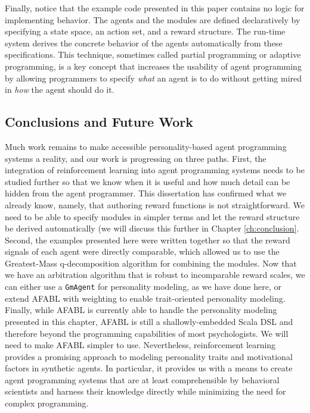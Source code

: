 
Finally, notice that the example code presented in this paper contains no logic for implementing behavior.  The agents and the modules are defined declaratively by specifying a state space, an action set, and a reward structure.  The run-time system derives the concrete behavior of the agents automatically from these specifications.  This technique, sometimes called partial programming or adaptive programming\cite{simpkins2008towards}, is a key concept that increases the usability of agent programming by allowing programmers to specify {\em what} an agent is to do without getting mired in {\em how} the agent should do it.

\subsection{Conclusions and Future Work}

Much work remains to make accessible personality-based agent programming systems a reality, and our work is progressing on three paths.  First, the integration of reinforcement learning into agent programming systems needs to be studied further so that we know when it is useful and how much detail can be hidden from the agent programmer. This dissertation has confirmed what we already know, namely, that authoring reward functions is not straightforward. We need to be able to specify modules in simpler terms and let the reward structure be derived automatically (we will discuss this further in Chapter \ref{ch:conclusion}. Second, the examples presented here were written together so that the reward signals of each agent were directly comparable, which allowed us to use the Greatest-Mass q-decomposition algorithm for combining the modules. Now that we have an arbitration algorithm that is robust to incomparable reward scales, we can either use a {\tt GmAgent} for personality modeling, as we have done here, or extend AFABL with weighting to enable trait-oriented personality modeling. Finally, while AFABL is currently able to handle the personality modeling presented in this chapter, AFABL is still a shallowly-embedded Scala DSL and therefore beyond the programming capabilities of most psychologists. We will need to make AFABL simpler to use. Nevertheless, reinforcement learning provides a promising approach to modeling personality traits and motivational factors in synthetic agents.  In particular, it provides us with a means to create agent programming systems that are at least comprehensible by behavioral scientists and harness their knowledge directly while minimizing the need for complex programming.

